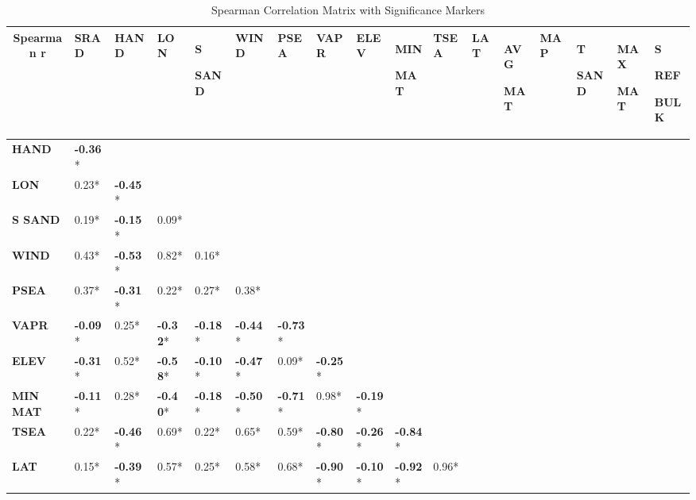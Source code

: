 \begin{table}
\caption{Spearman Correlation Matrix with Significance Markers}
\label{tab:correlation_matrix}
\tiny 
\hspace*{-3.17cm}
\begin{tabular}{p{1.6cm}p{0.68cm}p{0.68cm}p{0.68cm}p{0.68cm}p{0.68cm}p{0.68cm}p{0.68cm}p{0.68cm}p{0.68cm}p{0.68cm}p{0.68cm}p{0.68cm}p{0.68cm}p{0.68cm}p{0.68cm}p{0.68cm}}
\toprule
\multicolumn{1}{c}{Spearman r}  & \textbf{SRAD} & \textbf{HAND} & \textbf{LON} & \textbf{S} \par \textbf{SAND} & \textbf{WIND} & \textbf{PSEA} & \textbf{VAPR} & \textbf{ELEV} & \textbf{MIN} \par \textbf{MAT} & \textbf{TSEA} & \textbf{LAT} & \textbf{AVG} \par \textbf{MAT} & \textbf{MAP} & \textbf{T} \par \textbf{SAND} & \textbf{MAX} \par \textbf{MAT} & \textbf{S} \par \textbf{REF} \par \textbf{BULK} \\
\midrule
\textbf{HAND} & \textbf{-0.36}* &  &  &  &  &  &  &  &  &  &  &  &  &  &  &  \\
\textbf{LON} & 0.23* & \textbf{-0.45}* &  &  &  &  &  &  &  &  &  &  &  &  &  &  \\
\textbf{S SAND} & 0.19* & \textbf{-0.15}* & 0.09* &  &  &  &  &  &  &  &  &  &  &  &  &  \\
\textbf{WIND} & 0.43* & \textbf{-0.53}* & 0.82* & 0.16* &  &  &  &  &  &  &  &  &  &  &  &  \\
\textbf{PSEA} & 0.37* & \textbf{-0.31}* & 0.22* & 0.27* & 0.38* &  &  &  &  &  &  &  &  &  &  &  \\
\textbf{VAPR} & \textbf{-0.09}* & 0.25* & \textbf{-0.32}* & \textbf{-0.18}* & \textbf{-0.44}* & \textbf{-0.73}* &  &  &  &  &  &  &  &  &  &  \\
\textbf{ELEV} & \textbf{-0.31}* & 0.52* & \textbf{-0.58}* & \textbf{-0.10}* & \textbf{-0.47}* & 0.09* & \textbf{-0.25}* &  &  &  &  &  &  &  &  &  \\
\textbf{MIN MAT} & \textbf{-0.11}* & 0.28* & \textbf{-0.40}* & \textbf{-0.18}* & \textbf{-0.50}* & \textbf{-0.71}* & 0.98* & \textbf{-0.19}* &  &  &  &  &  &  &  &  \\
\textbf{TSEA} & 0.22* & \textbf{-0.46}* & 0.69* & 0.22* & 0.65* & 0.59* & \textbf{-0.80}* & \textbf{-0.26}* & \textbf{-0.84}* &  &  &  &  &  &  &  \\
\textbf{LAT} & 0.15* & \textbf{-0.39}* & 0.57* & 0.25* & 0.58* & 0.68* & \textbf{-0.90}* & \textbf{-0.10}* & \textbf{-0.92}* & 0.96* &  &  &  &  &  &  \\

\end{tabular}
\end{table}
